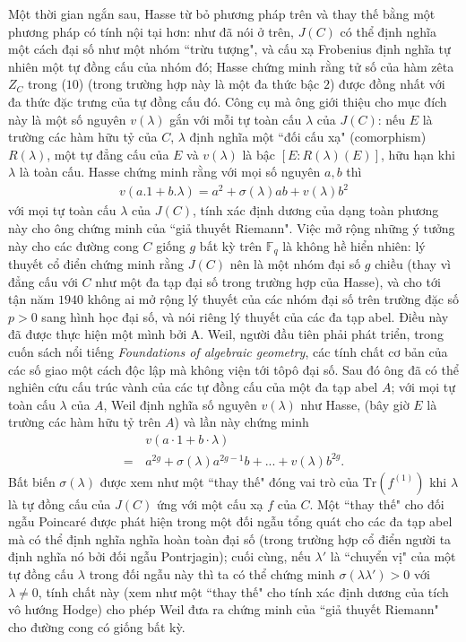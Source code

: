 \begin{multicols}{2}
	\vskip 0.1cm
	Một thời gian ngắn sau, Hasse từ bỏ phương pháp trên và thay thế bằng một phương pháp có tính nội tại hơn: như đã nói ở trên, $J(C)$ có thể định nghĩa một cách đại số như một nhóm ``trừu tượng", và cấu xạ Frobenius định nghĩa tự nhiên một tự đồng cấu của nhóm đó; Hasse chứng minh rằng tử số của hàm zêta $Z_C$ trong ($10$) (trong trường hợp này là một đa thức bậc $2$) được đồng nhất với đa thức đặc trưng của tự đồng cấu đó. Công cụ mà ông giới thiệu cho mục đích này là một số nguyên $v(\lambda)$ gắn với mỗi tự toàn cấu $\lambda$ của $J(C)$: nếu $E$ là trường các hàm hữu tỷ của $C$, $\lambda$ định nghĩa một ``đối cấu xạ" (comorphism) $R(\lambda)$, một tự đẳng cấu của $E$ và $v(\lambda)$ là bậc $[E:R(\lambda)(E)]$, hữu hạn khi $\lambda$ là toàn cấu. Hasse chứng minh rằng với mọi số nguyên $a,b$ thì
	\begin{align*} v(a.1 + b.\lambda) = a^2 + \sigma(\lambda)ab + v(\lambda)b^2
	\end{align*} 
	với mọi tự toàn cấu $\lambda$ của $J(C)$, tính xác định dương của dạng toàn phương này cho ông chứng minh của ``giả thuyết Riemann". 
	\vskip 0.1cm
	Việc mở rộng những ý tưởng này cho các đường cong $C$ giống $g$ bất kỳ trên $\mathbb{F}_q$ là không hề hiển nhiên: lý thuyết cổ điển chứng minh rằng $J(C)$ nên là một nhóm đại số $g$ chiều (thay vì đẳng cấu với $C$ như một đa tạp đại số trong trường hợp của Hasse), và cho tới tận năm $1940$ không ai mở rộng lý thuyết của các nhóm đại số trên trường đặc số $p>0$ sang hình học đại số, và nói riêng lý thuyết của các đa tạp abel. Điều này đã được thực hiện một mình bởi A. Weil, người đầu tiên phải phát triển, trong cuốn sách nổi tiếng \textit{Foundations of algebraic geometry}, các tính chất cơ bản của các số giao một cách độc lập mà không viện tới tôpô đại số. Sau đó ông đã có thể nghiên cứu cấu trúc vành của các tự đồng cấu của một đa tạp abel $A$; với mọi tự toàn cấu $\lambda$ của $A$, Weil định nghĩa số nguyên $v(\lambda)$ như Hasse, (bây giờ $E$ là trường các hàm hữu tỷ trên $A$) và lần này chứng minh
	\begin{align*}
		&v(a \cdot 1 + b \cdot \lambda) \\
		= \,&a^{2g} + \sigma(\lambda)a^{2g-1}b +...+ v(\lambda)b^{2g}.
	\end{align*}
	Bất biến $\sigma(\lambda)$ được xem như một ``thay thế" đóng vai trò của $\mathrm{Tr}(f^{(1)})$ khi $\lambda$ là tự đồng cấu của $J(C)$ ứng với một cấu xạ $f$ của $C$. Một ``thay thế" cho đối ngẫu Poincaré được phát hiện trong một đối ngẫu tổng quát cho các đa tạp abel mà có thể định nghĩa nghĩa hoàn toàn đại số (trong trường hợp cổ điển người ta định nghĩa nó bởi đối ngẫu Pontrjagin); cuối cùng, nếu $\lambda'$ là ``chuyển vị" của một tự đồng cấu $\lambda$ trong đối ngẫu này thì ta có thể chứng minh $\sigma(\lambda \lambda') > 0$ với $\lambda \neq 0$, tính chất này (xem như một ``thay thế" cho tính xác định dương của tích vô hướng Hodge) cho phép Weil đưa ra chứng minh của ``giả thuyết Riemann" cho đường cong có giống bất kỳ.

\end{multicols}
